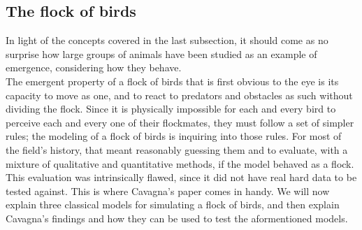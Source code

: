 \subsection{The flock of birds}
In light of the concepts covered in the last subsection, it should come as no surprise how large groups of animals have been studied as an example of emergence, considering how they behave. \\
The emergent property of a flock of birds that is first obvious to the eye is its capacity to move as one, and to react to predators and obstacles as such without dividing the flock. Since it is physically impossible for each and every bird to perceive each and every one of their flockmates, they must follow a set of simpler rules; the modeling of a flock of birds is inquiring into those rules. For most of the field's history, that meant reasonably guessing them and to evaluate, with a mixture of qualitative and quantitative methods, if the model behaved as a flock. This evaluation was intrinsically flawed, since it did not have real hard data to be tested against. This is where Cavagna's paper comes in handy. We will now explain three classical models for simulating a flock of birds, and then explain Cavagna's findings and how they can be used to test the aformentioned models.
